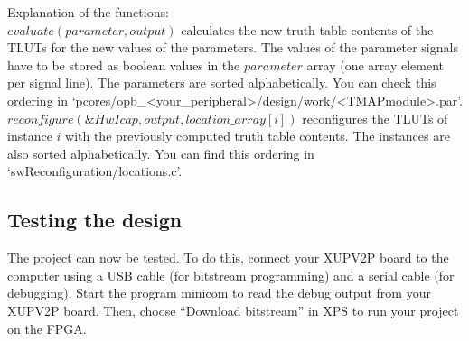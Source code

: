 \documentclass[a4paper,oneside]{memoir}
\begin{document}
Explanation of the functions:\\
$evaluate(parameter, output)$ calculates the new truth table contents of the TLUTs for the new values of the parameters. The  values of the parameter signals have to be stored as boolean values in the $parameter$ array (one array element per signal line). The parameters are sorted alphabetically. You can check this ordering in `pcores/opb\_<your\_peripheral>/design/work/<TMAPmodule>.par'.\\
$reconfigure(\&HwIcap, output, location\_array[i])$ reconfigures the TLUTs of instance $i$ with the previously computed truth table contents. The instances are also sorted alphabetically. You can find this ordering in `swReconfiguration/locations.c'.


\subsection{Testing the design}\label{sec:testing}
The project can now be tested. To do this, connect your XUPV2P board to the computer using a USB cable (for bitstream programming) and a serial cable (for debugging). Start the program minicom to read the debug output from your XUPV2P board. Then, choose ``Download bitstream'' in XPS to run your project on the FPGA.


\end{document}

